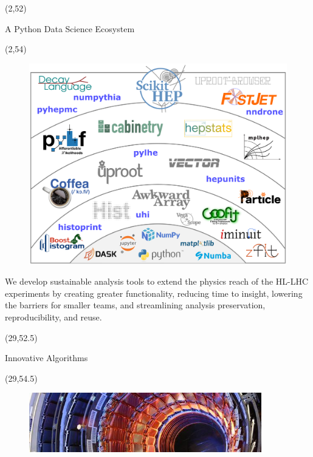 \documentclass[final]{beamer}
\begin{document}
\begin{frame}{}
\begin{textblock}{25.0}(2,52)
\begin{block}{A Python Data Science Ecosystem}
\begin{textblock}{25.0}(2,54)
\begin{figure}[tbph]
\centering
\includegraphics[width=1.00\textwidth]{images/scikit-hep-shells-hep.png}
\end{figure}
We develop sustainable analysis tools to extend the physics reach of the HL-LHC experiments by creating greater functionality, reducing time to insight, lowering the barriers for smaller teams, and streamlining analysis preservation, reproducibility, and reuse.
\end{textblock}
\end{block}
\end{textblock}
\begin{textblock}{25.0}(29,52.5)
\begin{block}{Innovative Algorithms}
\begin{textblock}{25.0}(29,54.5)
\begin{figure}[tbph]
\centering
\includegraphics[width=0.90\textwidth]{images/0610026_01-A5-at-72-dpi-slice.jpg}

\end{figure}
\end{textblock}
\end{block}
\end{textblock}
\end{frame}
\end{document}
